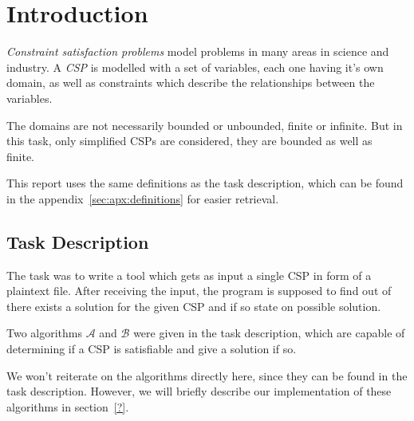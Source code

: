 \section{Introduction}

\emph{Constraint satisfaction problems} model problems in many areas in science and industry.
A \emph{CSP} is modelled with a set of variables, each one having it's own domain, as well as constraints which describe the relationships between the variables.~\cite{MF19}

The domains are not necessarily bounded or unbounded, finite or infinite.
But in this task, only simplified CSPs are considered, they are bounded as well as finite.~\cite{MF19}

This report uses the same definitions as the task description, which can be found in the appendix~\ref{sec:apx:definitions} for easier retrieval.

\subsection{Task Description}

The task was to write a tool which gets as input a single CSP in form of a plaintext file.
After receiving the input, the program is supposed to find out of there exists a solution for the given CSP and if so state on possible solution.

Two algorithms $\mathcal{A}$ and $\mathcal{B}$ were given in the task description, which are capable of determining if a CSP is satisfiable and give a solution if so.

We won't reiterate on the algorithms directly here, since they can be found in the task description.
However, we will briefly describe our implementation of these algorithms in section~\ref{?}.

